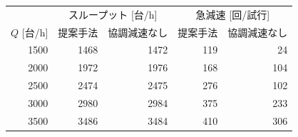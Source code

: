 \begin{tabular}{rrrrr}
\hline \hline
 & \multicolumn{2}{c}{スループット [台/h]} & \multicolumn{2}{c}{急減速 [回/試行]} \\
$Q$ [台/h] & 提案手法 & 協調減速なし & 提案手法 & 協調減速なし \\
\hline
1500 & 1468 & 1472 & 119 & 24 \\
2000 & 1972 & 1976 & 168 & 104 \\
2500 & 2474 & 2475 & 276 & 102 \\
3000 & 2980 & 2984 & 375 & 233 \\
3500 & 3486 & 3484 & 410 & 306 \\
\hline
\end{tabular}
